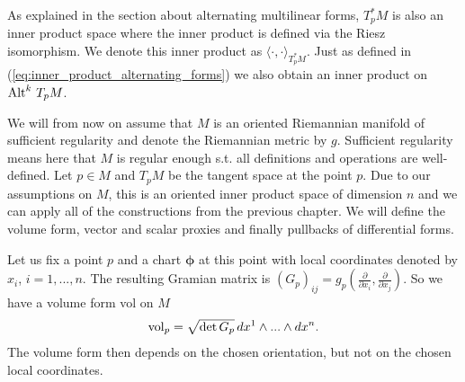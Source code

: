 \documentclass[../master_thesis.tex]{subfiles}
\begin{document}
As explained in the section about alternating multilinear forms, $T^*_p M$ is also an 
inner product space where the inner product is defined via the Riesz isomorphism.
We denote this inner product as $\langle \cdot, \cdot \rangle _{T^*_p M}$.
Just as defined in (\ref{eq:inner_product_alternating_forms}) 
we also obtain an inner product on 
${\operatorname{Alt}^{k}\,T_p M}$.

We will from now on assume that $M$ is an oriented Riemannian manifold of sufficient 
regularity and denote the Riemannian metric by $g$. 
Sufficient regularity means here that $M$ is regular enough s.t. all definitions and operations 
are well-defined.
Let $p \in M$ and $T_p M$ be the tangent space at the point $p$. 
Due to our assumptions on $M$, this is an oriented inner product space of 
dimension $n$ and we can apply 
all of the constructions from the previous chapter. 
We will define the volume form, vector and scalar proxies and finally pullbacks
of differential forms.

Let us fix a point $p$ and a chart $\boldsymbol{\phi}$ 
at this point with local coordinates denoted by $x_i$, $i=1,...,n$. 
The resulting Gramian matrix is
$(G_p)_{ij} = g_p(\frac{\partial}{\partial x_i},\frac{\partial}{\partial x_j})$.
So we have a volume form vol on $M$ 
\begin{align*}
    \operatorname{vol}_p = \sqrt{\det G_p} \,dx^1 \wedge ... \wedge dx^n.
\end{align*}
The volume form then depends on the chosen orientation, but not on the 
chosen local coordinates.

\end{document}
